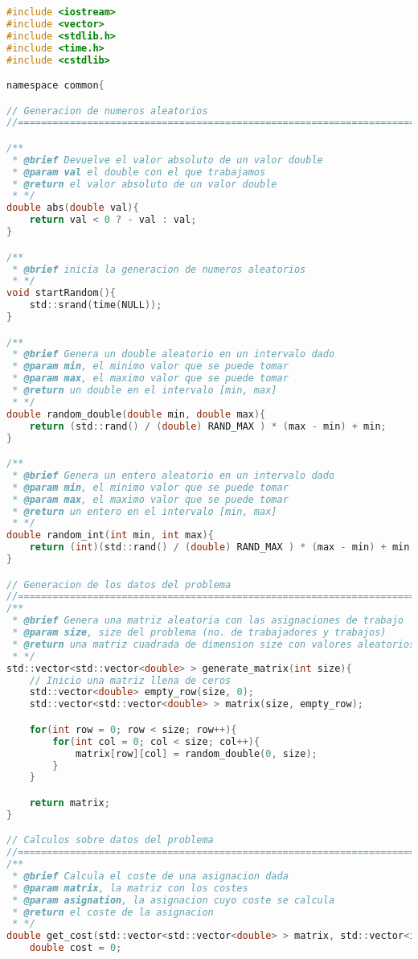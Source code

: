 \documentclass[10pt, a4paper]{article}
\theoremstyle{theorem-style}
\theoremstyle{theorem-style}
\theoremstyle{definition-style}
\theoremstyle{remark-style}
\theoremstyle{example-style}
\theoremstyle{definition-style}
\theoremstyle{remark-style}
\begin{document}
\begin{lstlisting}[language=C]
#include <iostream>
#include <vector>
#include <stdlib.h>
#include <time.h>
#include <cstdlib>

namespace common{

// Generacion de numeros aleatorios
//==============================================================================

/**
 * @brief Devuelve el valor absoluto de un valor double 
 * @param val el double con el que trabajamos
 * @return el valor absoluto de un valor double
 * */
double abs(double val){
    return val < 0 ? - val : val;
}

/**
 * @brief inicia la generacion de numeros aleatorios
 * */
void startRandom(){
    std::srand(time(NULL));
}

/**
 * @brief Genera un double aleatorio en un intervalo dado
 * @param min, el minimo valor que se puede tomar
 * @param max, el maximo valor que se puede tomar
 * @return un double en el intervalo [min, max]
 * */
double random_double(double min, double max){
    return (std::rand() / (double) RAND_MAX ) * (max - min) + min;
}

/**
 * @brief Genera un entero aleatorio en un intervalo dado
 * @param min, el minimo valor que se puede tomar
 * @param max, el maximo valor que se puede tomar
 * @return un entero en el intervalo [min, max]
 * */
double random_int(int min, int max){
    return (int)(std::rand() / (double) RAND_MAX ) * (max - min) + min;
}

// Generacion de los datos del problema
//==============================================================================
/**
 * @brief Genera una matriz aleatoria con las asignaciones de trabajo
 * @param size, size del problema (no. de trabajadores y trabajos)
 * @return una matriz cuadrada de dimension size con valores aleatorios en el intervalo [0, size]
 * */
std::vector<std::vector<double> > generate_matrix(int size){
    // Inicio una matriz llena de ceros
    std::vector<double> empty_row(size, 0);
    std::vector<std::vector<double> > matrix(size, empty_row);

    for(int row = 0; row < size; row++){
        for(int col = 0; col < size; col++){
            matrix[row][col] = random_double(0, size);
        }
    }

    return matrix;
}

// Calculos sobre datos del problema
//==============================================================================
/**
 * @brief Calcula el coste de una asignacion dada
 * @param matrix, la matriz con los costes
 * @param asignation, la asignacion cuyo coste se calcula
 * @return el coste de la asignacion
 * */
double get_cost(std::vector<std::vector<double> > matrix, std::vector<int> asignation){
    double cost = 0;


\end{lstlisting}
\end{document}
